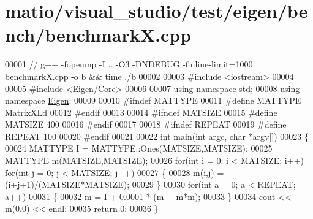 \hypertarget{matio_2visual__studio_2test_2eigen_2bench_2benchmark_x_8cpp_source}{}\section{matio/visual\+\_\+studio/test/eigen/bench/benchmarkX.cpp}
\label{matio_2visual__studio_2test_2eigen_2bench_2benchmark_x_8cpp_source}

\begin{DoxyCode}
00001 \textcolor{comment}{// g++ -fopenmp -I .. -O3 -DNDEBUG -finline-limit=1000 benchmarkX.cpp -o b && time ./b}
00002 
00003 \textcolor{preprocessor}{#include <iostream>}
00004 
00005 \textcolor{preprocessor}{#include <Eigen/Core>}
00006 
00007 \textcolor{keyword}{using namespace }\hyperlink{namespacestd}{std};
00008 \textcolor{keyword}{using namespace }\hyperlink{namespace_eigen}{Eigen};
00009 
00010 \textcolor{preprocessor}{#ifndef MATTYPE}
00011 \textcolor{preprocessor}{#define MATTYPE MatrixXLd}
00012 \textcolor{preprocessor}{#endif}
00013 
00014 \textcolor{preprocessor}{#ifndef MATSIZE}
00015 \textcolor{preprocessor}{#define MATSIZE 400}
00016 \textcolor{preprocessor}{#endif}
00017 
00018 \textcolor{preprocessor}{#ifndef REPEAT}
00019 \textcolor{preprocessor}{#define REPEAT 100}
00020 \textcolor{preprocessor}{#endif}
00021 
00022 \textcolor{keywordtype}{int} main(\textcolor{keywordtype}{int} argc, \textcolor{keywordtype}{char} *argv[])
00023 \{
00024     MATTYPE I = MATTYPE::Ones(MATSIZE,MATSIZE);
00025     MATTYPE m(MATSIZE,MATSIZE);
00026     \textcolor{keywordflow}{for}(\textcolor{keywordtype}{int} i = 0; i < MATSIZE; i++) \textcolor{keywordflow}{for}(\textcolor{keywordtype}{int} j = 0; j < MATSIZE; j++)
00027     \{
00028         m(i,j) = (i+j+1)/(MATSIZE*MATSIZE);
00029     \}
00030     \textcolor{keywordflow}{for}(\textcolor{keywordtype}{int} a = 0; a < REPEAT; a++)
00031     \{
00032         m = I + 0.0001 * (m + m*m);
00033     \}
00034     cout << m(0,0) << endl;
00035     \textcolor{keywordflow}{return} 0;
00036 \}
\end{DoxyCode}
